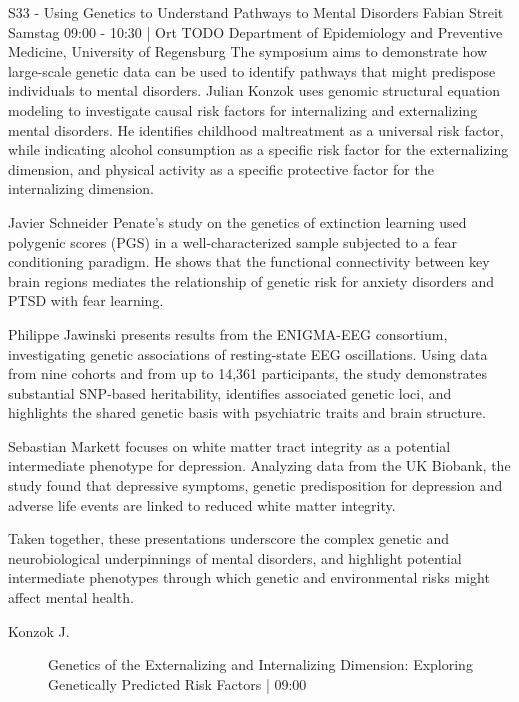 
            \begin{symposium}
            {S33 - Using Genetics to Understand Pathways to Mental Disorders}
            {Fabian Streit}
            {Samstag 09:00 - 10:30 | Ort TODO}
            {Department of Epidemiology and Preventive Medicine, University of Regensburg}
            The symposium aims to demonstrate how large-scale genetic data can be used to identify pathways that might predispose individuals to mental disorders.
Julian Konzok uses genomic structural equation modeling to investigate causal risk factors for internalizing and externalizing mental disorders. He identifies childhood maltreatment as a universal risk factor, while indicating alcohol consumption as a specific risk factor for the externalizing dimension, and physical activity as a specific protective factor for the internalizing dimension.

Javier Schneider Penate's study on the genetics of extinction learning used polygenic scores (PGS) in a well-characterized sample subjected to a fear conditioning paradigm. He shows that the functional connectivity between key brain regions mediates the relationship of genetic risk for anxiety disorders and PTSD with fear learning.

Philippe Jawinski presents results from the ENIGMA-EEG consortium, investigating genetic associations of resting-state EEG oscillations. Using data from nine cohorts and from up to 14,361 participants, the study demonstrates substantial SNP-based heritability, identifies associated genetic loci, and highlights the shared genetic basis with psychiatric traits and brain structure.

Sebastian Markett focuses on white matter tract integrity as a potential intermediate phenotype for depression. Analyzing data from the UK Biobank, the study found that depressive symptoms, genetic predisposition for depression and adverse life events are linked to reduced white matter integrity.

Taken together, these presentations underscore the complex genetic and neurobiological underpinnings of mental disorders, and highlight potential intermediate phenotypes through which genetic and environmental risks might affect mental health.
            \begin{description}    
            
                \item [ Konzok J.] Genetics of the Externalizing and Internalizing Dimension: Exploring Genetically Predicted Risk Factors \textcolor{mygray}{ | 09:00}    
                

\end{description}
\end{symposium}
